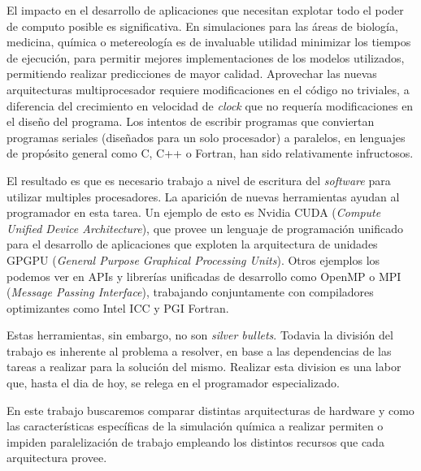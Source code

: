 El impacto en el desarrollo de aplicaciones que necesitan explotar todo el poder
de computo posible es significativa. En simulaciones para las \'areas de biolog\'ia,
medicina, qu\'imica o metereolog\'ia es de invaluable utilidad minimizar los tiempos
de ejecuci\'on, para permitir mejores implementaciones de los modelos utilizados,
permitiendo realizar predicciones de mayor calidad. Aprovechar las nuevas
arquitecturas multiprocesador requiere modificaciones en el c\'odigo no triviales,
a diferencia del crecimiento en velocidad de \textit{clock} que no requer\'ia modificaciones
en el dise\~no del programa. Los intentos de escribir programas que conviertan
programas seriales (dise\~nados para un solo procesador) a paralelos, en lenguajes
de prop\'osito general como C, C++ o Fortran, han sido relativamente infructosos.

El resultado es que es necesario trabajo a nivel de escritura del \textit{software}
para utilizar multiples procesadores. La aparici\'on de nuevas herramientas ayudan
al programador en esta tarea. Un ejemplo de esto es Nvidia CUDA (\textit{Compute
Unified Device Architecture}), que provee un lenguaje de programaci\'on unificado
para el desarrollo de aplicaciones que exploten la arquitectura de unidades GPGPU
(\textit{General Purpose Graphical Processing Units}). Otros ejemplos los podemos
ver en APIs y librer\'ias unificadas de desarrollo como OpenMP o MPI
(\textit{Message Passing Interface}), trabajando conjuntamente con compiladores
optimizantes como Intel ICC y PGI Fortran.

Estas herramientas, sin embargo, no son \textit{silver bullets}. Todavia la divisi\'on
del trabajo es inherente al problema a resolver, en base a las dependencias de las tareas
a realizar para la soluci\'on del mismo. Realizar esta division es una labor que, hasta
el dia de hoy, se relega en el programador especializado.

En este trabajo buscaremos comparar distintas arquitecturas de hardware y como
las caracter\'isticas espec\'ificas de la simulaci\'on qu\'imica a realizar permiten
o impiden paralelizaci\'on de trabajo empleando los distintos recursos que cada
arquitectura provee.
